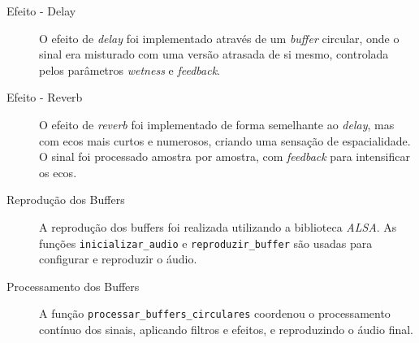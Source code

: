 \begin{description}
\item [Efeito - Delay]

O efeito de \textit{delay} foi implementado através de um \textit{buffer} circular, onde o sinal era misturado com uma versão atrasada de si mesmo, controlada pelos parâmetros \textit{wetness} e \textit{feedback}.

\item [Efeito - Reverb]

O efeito de \textit{reverb} foi implementado de forma semelhante ao \textit{delay}, mas com ecos mais curtos e numerosos, criando uma sensação de espacialidade. O sinal foi processado amostra por amostra, com \textit{feedback} para intensificar os ecos.

\item [Reprodução dos Buffers]

A reprodução dos buffers foi realizada utilizando a biblioteca \textit{ALSA}. As funções \verb|inicializar_audio| e \verb|reproduzir_buffer| são usadas para configurar e reproduzir o áudio.

\item [Processamento dos Buffers]

A função \verb|processar_buffers_circulares| coordenou o processamento contínuo dos sinais, aplicando filtros e efeitos, e reproduzindo o áudio final.
\end{description}




